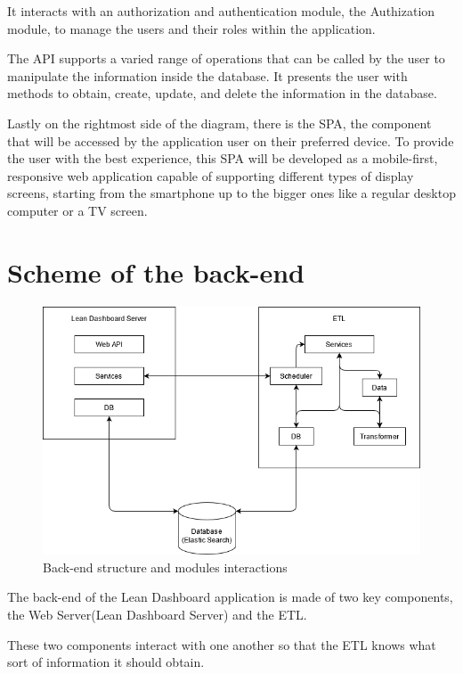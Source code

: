 \documentclass[a4paper,twoside,10pt]{report}
\begin{document}
It interacts with an authorization and authentication module, the Authization module, to manage the users and their roles within the application.

The API supports a varied range of operations that can be called by the user to manipulate the information inside the database. It presents the user with methods to obtain, create, update, and delete the information in the database.

Lastly on the rightmost side of the diagram, there is the SPA, the component that will be accessed by the application user on their preferred device. To provide the user with the best experience, this SPA will be developed as a mobile-first, responsive web application capable of supporting different types of display screens, starting from the smartphone up to the bigger ones like a regular desktop computer or a TV screen.
\newpage
\section{Scheme of the back-end}
\begin{figure}[h!]
\center
    \includegraphics[width=\textwidth]{arquitetura software.png}
    \caption{Back-end structure and modules interactions}
\end{figure}
The back-end of the Lean Dashboard application is made of two key components, the Web Server(Lean Dashboard Server) and the ETL.

These two components interact with one another so that the ETL knows what sort of information it should obtain.
\end{document}
